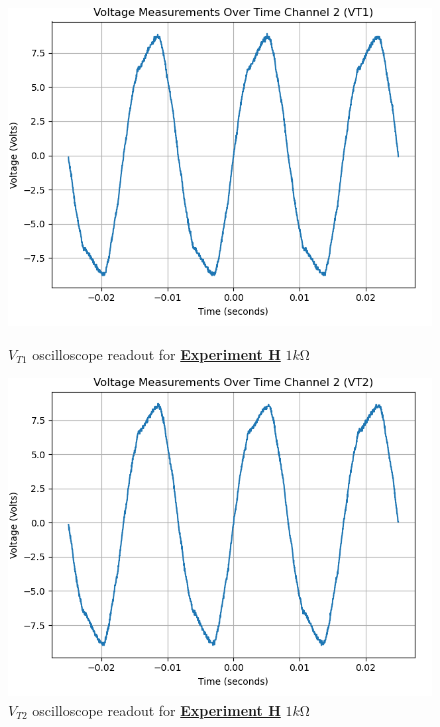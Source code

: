 \documentclass[
	letterpaper
	12pt
]{template}
\newcommand{\bref}[2]{\textbf{\hyperref[#1]{#2}}}
\begin{document}
\begin{figure}[H]\label{data::H4}
	\centering
	\begin{minipage}[c]{0.45\textwidth}
		\centering
		\includegraphics[width=\textwidth]{figures/H/7--ch2.png}
	    \caption{$V_{T1}$ oscilloscope readout for \bref{exp::H}{Experiment H} $1\unit{k\ohm}$ }
	\end{minipage}
	\hfill
	\begin{minipage}[c]{0.45\textwidth}
		\centering
		\includegraphics[width=\textwidth]{figures/H/8--ch2.png}
	    \caption{$V_{T2}$ oscilloscope readout for \bref{exp::H}{Experiment H} $1\unit{k\ohm}$ }
	\end{minipage}
\end{figure}
\end{document}

